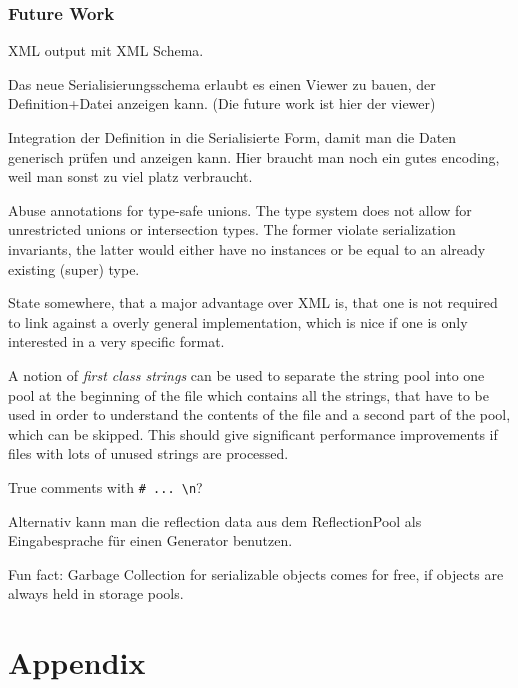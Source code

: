 \documentclass[a4paper,10pt]{article}
\begin{document}

\section{Future Work}

XML output mit XML Schema.

Das neue Serialisierungsschema erlaubt es einen Viewer zu bauen, der Definition+Datei anzeigen kann. (Die future work ist hier der viewer)

Integration der Definition in die Serialisierte Form, damit man die Daten generisch prüfen und anzeigen kann. Hier braucht man noch ein gutes encoding, weil man sonst zu viel platz verbraucht.

Abuse annotations for type-safe unions. The type system does not allow for unrestricted unions or intersection types. The former violate serialization invariants, the latter would either have no instances or be equal to an already existing (super) type.

State somewhere, that a major advantage over XML is, that one is not required to link against a overly general implementation, which is nice if one is only interested in a very specific format.

A notion of \textit{first class strings} can be used to separate the string pool into one pool at the beginning of the file which contains all the strings, that have to be used in order to understand the contents of the file and a second part of the pool, which can be skipped. This should give significant performance improvements if files with lots of unused strings are processed.

True comments with \verb/# ... \n/?

Alternativ kann man die reflection data aus dem ReflectionPool als Eingabesprache für einen Generator benutzen.

Fun fact: Garbage Collection for serializable objects comes for free, if objects are always held in storage pools.

\newpage
\todos

\part{Appendix}
\renewcommand\thesection{\Alph{section}}
\setcounter{section}{0}





\newpage
\glsaddall
\printglossaries
\end{document}

